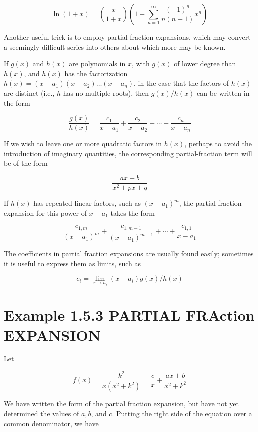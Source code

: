 \documentclass[10pt]{article}
\begin{document}
$$
\ln (1+x)=\left(\frac{x}{1+x}\right)\left(1-\sum_{n=1}^{\infty} \frac{(-1)^{n}}{n(n+1)} x^{n}\right)
$$

Another useful trick is to employ partial fraction expansions, which may convert a seemingly difficult series into others about which more may be known.

If $g(x)$ and $h(x)$ are polynomials in $x$, with $g(x)$ of lower degree than $h(x)$, and $h(x)$ has the factorization $h(x)=\left(x-a_{1}\right)\left(x-a_{2}\right) \ldots\left(x-a_{n}\right)$, in the case that the factors of $h(x)$ are distinct (i.e., $h$ has no multiple roots), then $g(x) / h(x)$ can be written in the form


\begin{equation*}
\frac{g(x)}{h(x)}=\frac{c_{1}}{x-a_{1}}+\frac{c_{2}}{x-a_{2}}+\cdots+\frac{c_{n}}{x-a_{n}} \tag{1.83}
\end{equation*}


If we wish to leave one or more quadratic factors in $h(x)$, perhaps to avoid the introduction of imaginary quantities, the corresponding partial-fraction term will be of the form

$$
\frac{a x+b}{x^{2}+p x+q}
$$

If $h(x)$ has repeated linear factors, such as $\left(x-a_{1}\right)^{m}$, the partial fraction expansion for this power of $x-a_{1}$ takes the form

$$
\frac{c_{1, m}}{\left(x-a_{1}\right)^{m}}+\frac{c_{1, m-1}}{\left(x-a_{1}\right)^{m-1}}+\cdots+\frac{c_{1,1}}{x-a_{1}}
$$

The coefficients in partial fraction expansions are usually found easily; sometimes it is useful to express them as limits, such as


\begin{equation*}
c_{i}=\lim _{x \rightarrow a_{i}}\left(x-a_{i}\right) g(x) / h(x) \tag{1.84}
\end{equation*}


\section*{Example 1.5.3 PARTIAL FRAction EXPANSION}
Let

$$
f(x)=\frac{k^{2}}{x\left(x^{2}+k^{2}\right)}=\frac{c}{x}+\frac{a x+b}{x^{2}+k^{2}}
$$

We have written the form of the partial fraction expansion, but have not yet determined the values of $a, b$, and $c$. Putting the right side of the equation over a common denominator, we have
\end{document}
